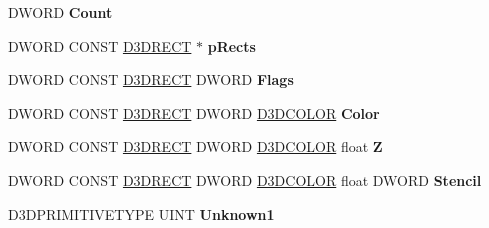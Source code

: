 \begin{DoxyCompactItemize}
\item 
\mbox{\label{struct___i_direct3_d_device9_vtbl___i_n_t_a44cdec85a7e4ad722f303ed320144b91}} 
D\+W\+O\+RD {\bfseries Count}
\item 
\mbox{\label{struct___i_direct3_d_device9_vtbl___i_n_t_a747235392675a1fb5956c6e8e01b61f9}} 
D\+W\+O\+RD C\+O\+N\+ST \hyperlink{struct___d3_d_r_e_c_t}{D3\+D\+R\+E\+CT} $\ast$ {\bfseries p\+Rects}
\item 
\mbox{\label{struct___i_direct3_d_device9_vtbl___i_n_t_a1e1ca61ffb0531f718e4cccbff846f5a}} 
D\+W\+O\+RD C\+O\+N\+ST \hyperlink{struct___d3_d_r_e_c_t}{D3\+D\+R\+E\+CT} D\+W\+O\+RD {\bfseries Flags}
\item 
\mbox{\label{struct___i_direct3_d_device9_vtbl___i_n_t_affd1942d9ef7b059e0784181ffb55929}} 
D\+W\+O\+RD C\+O\+N\+ST \hyperlink{struct___d3_d_r_e_c_t}{D3\+D\+R\+E\+CT} D\+W\+O\+RD \hyperlink{struct_d3_d_c_o_l_o_r}{D3\+D\+C\+O\+L\+OR} {\bfseries Color}
\item 
\mbox{\label{struct___i_direct3_d_device9_vtbl___i_n_t_aff6ba9e1abcaf5d11d405fa883338f65}} 
D\+W\+O\+RD C\+O\+N\+ST \hyperlink{struct___d3_d_r_e_c_t}{D3\+D\+R\+E\+CT} D\+W\+O\+RD \hyperlink{struct_d3_d_c_o_l_o_r}{D3\+D\+C\+O\+L\+OR} float {\bfseries Z}
\item 
\mbox{\label{struct___i_direct3_d_device9_vtbl___i_n_t_ab5d823850883c4793956d98f8e79b95b}} 
D\+W\+O\+RD C\+O\+N\+ST \hyperlink{struct___d3_d_r_e_c_t}{D3\+D\+R\+E\+CT} D\+W\+O\+RD \hyperlink{struct_d3_d_c_o_l_o_r}{D3\+D\+C\+O\+L\+OR} float D\+W\+O\+RD {\bfseries Stencil}
\item 
\mbox{\label{struct___i_direct3_d_device9_vtbl___i_n_t_a691c312900252093b2d3ffde8c23ab9f}} 
D3\+D\+P\+R\+I\+M\+I\+T\+I\+V\+E\+T\+Y\+PE U\+I\+NT {\bfseries Unknown1}
\item 
\mbox{\label{struct___i_direct3_d_device9_vtbl___i_n_t_ac0c3d24b90df4cd3c098124fe48481a7}} 

\end{DoxyCompactItemize}
